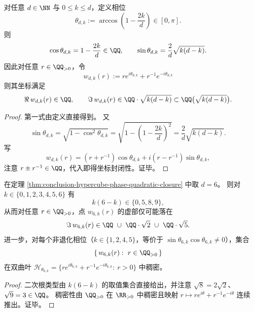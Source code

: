 \begin{theorem}[有理余弦相位的二次体封闭性]\label{thm:conclusion-hypercube-phase-quadratic-closure}
对任意 \(d\in\NN\) 与 \(0\le k\le d\)，定义相位
\[
\theta_{d,k}:=\arccos\!\left(1-\frac{2k}{d}\right)\in[0,\pi].
\]
则
\[
\cos\theta_{d,k}=1-\frac{2k}{d}\in\QQ,
\qquad
\sin\theta_{d,k}=\frac{2}{d}\sqrt{k(d-k)}.
\]
因此对任意 \(r\in\QQ_{>0}\)，令
\[
w_{d,k}(r):=r e^{i\theta_{d,k}}+r^{-1}e^{-i\theta_{d,k}}
\]
则其坐标满足
\[
\Re\,w_{d,k}(r)\in\QQ,
\qquad
\Im\,w_{d,k}(r)\in \QQ\cdot\sqrt{k(d-k)}\subset \QQ\bigl(\sqrt{k(d-k)}\bigr).
\]
\end{theorem}
\begin{proof}
第一式由定义直接得到。
又
\[
\sin\theta_{d,k}=\sqrt{1-\cos^2\theta_{d,k}}
=\sqrt{1-\left(1-\frac{2k}{d}\right)^2}
=\frac{2}{d}\sqrt{k(d-k)}.
\]
写
\[
w_{d,k}(r)=(r+r^{-1})\cos\theta_{d,k}+i(r-r^{-1})\sin\theta_{d,k},
\]
注意 \(r\pm r^{-1}\in\QQ\)，代入即得坐标封闭性。证毕。
\end{proof}

\begin{corollary}[6D 相位仅产生两类不可约二次根]\label{cor:conclusion-hypercube-phase-d6-only-sqrt2-sqrt5}
在定理 \ref{thm:conclusion-hypercube-phase-quadratic-closure} 中取 \(d=6\)。
则对 \(k\in\{0,1,2,3,4,5,6\}\) 有
\[
k(6-k)\in\{0,5,8,9\},
\]
从而对任意 \(r\in\QQ_{>0}\)，点 \(w_{6,k}(r)\) 的虚部仅可能落在
\[
\Im\,w_{6,k}(r)\in \QQ\ \cup\ \QQ\cdot\sqrt2\ \cup\ \QQ\cdot\sqrt5.
\]
进一步，对每个非退化相位（\(k\in\{1,2,4,5\}\)，等价于 \(\sin\theta_{6,k}\cos\theta_{6,k}\neq 0\)），集合
\[
\{\,w_{6,k}(r):\ r\in\QQ_{>0}\,\}
\]
在双曲叶
\(
\mathcal H_{\theta_{6,k}}=\{r e^{i\theta_{6,k}}+r^{-1}e^{-i\theta_{6,k}}:\ r>0\}
\)
中稠密。
\end{corollary}
\begin{proof}
二次根类型由 \(k(6-k)\) 的取值集合直接给出，并注意 \(\sqrt8=2\sqrt2\)、\(\sqrt9=3\in\QQ\)。
稠密性由 \(\QQ_{>0}\) 在 \(\RR_{>0}\) 中稠密且映射 \(r\mapsto r e^{i\theta}+r^{-1}e^{-i\theta}\) 连续推出。证毕。
\end{proof}

